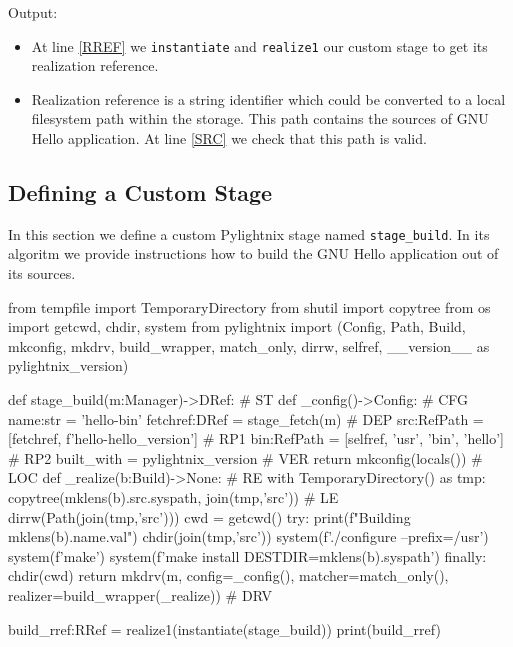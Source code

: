 Output:

\mysmallstdout

\begin{itemize}

  \item At line \ref{RREF} we \texttt{instantiate} and \texttt{realize1} our
    custom stage to get its realization reference.

  \item Realization reference is a string identifier which could be converted to
    a local filesystem path within the storage. This path contains the sources
    of GNU Hello application. At line \ref{SRC} we check that this path is
    valid.

\end{itemize}

\pagebreak
\subsection{Defining a Custom Stage}

In this section we define a custom Pylightnix stage named \texttt{stage\_build}.
In its algoritm we provide instructions how to build the GNU Hello application
out of its sources.

\begin{pythontexcode}
from tempfile import TemporaryDirectory
from shutil import copytree
from os import getcwd, chdir, system
from pylightnix import (Config, Path, Build, mkconfig, mkdrv,
  build_wrapper, match_only, dirrw, selfref,
  __version__ as pylightnix_version)

def stage_build(m:Manager)->DRef:                           # ST \label{ST}
  def _config()->Config:                                    # CFG \label{CFG}
    name:str = 'hello-bin'
    fetchref:DRef = stage_fetch(m)                          # DEP \label{DEP}
    src:RefPath = [fetchref, f'hello-{hello_version}']      # RP1 \label{RP1}
    bin:RefPath = [selfref, 'usr', 'bin', 'hello']          # RP2 \label{RP2}
    built_with = pylightnix_version                         # VER \label{VER}
    return mkconfig(locals())                               # LOC \label{LOC}
  def _realize(b:Build)->None:                              # RE \label{RE}
    with TemporaryDirectory() as tmp:
      copytree(mklens(b).src.syspath, join(tmp,'src'))      # LE \label{LE}
      dirrw(Path(join(tmp,'src')))
      cwd = getcwd()
      try:
        print(f"Building {mklens(b).name.val}")
        chdir(join(tmp,'src'))
        system(f'./configure --prefix=/usr')
        system(f'make')
        system(f'make install DESTDIR={mklens(b).syspath}')
      finally:
        chdir(cwd)
  return mkdrv(m, config=_config(),
                  matcher=match_only(),
                  realizer=build_wrapper(_realize))          # DRV \label{DRV}

build_rref:RRef = realize1(instantiate(stage_build))
print(build_rref)
\end{pythontexcode}

